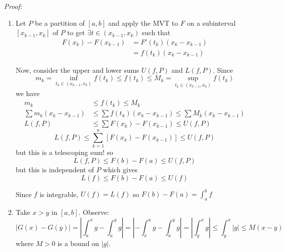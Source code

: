 \documentclass[12pt]{report}
\newcommand{\R}{\mathbb{R}}
\newcommand{\abs}[1]{\left\vert #1 \right\vert}
\newenvironment*{tbox}[2][gray]{
    \begin{tcolorbox}[
        parbox=false,
        colback=#1!5!white,
        colframe=#1!75!black,
        breakable,
        title={#2}
    ]}
    {\end{tcolorbox}}
\begin{document}
    \begin{tbox}{\textbf{Fundamental Theorem of Calculus:} 
        \begin{enumerate}[label=(\roman*)]
            \item If $f: [a, b] \to \R$ is integrable and $F: [a, b] \to \R$ satisfies $F'(x) = f(x)$ for all $x \in [a, b]$, then 
            \[\int_a^b f = F(b) - F(a)\]
            \item Let $g: [a, b] \to \R$ be integrable and define $G(x) = \int_a^x f$ for all $x \in [a, b]$. Then: $G$ is continuous on $[a, b]$. If $g$ is continuous at some point $c \in [a, b]$, then $G$ is differentiable at $c$ and $G'(c) = g(c)$
        \end{enumerate}}
        \emph{Proof:} 

        \begin{enumerate}[label=(\roman*)]
            \item Let $P$ be a partition of $[a, b]$ and apply the MVT to $F$ on a subinterval $[x_{k-1}, x_k]$ of $P$ to get $\exists t \in (x_{k - 1}, x_k)$ such that 
            \begin{align*}
                F(x_k) - F(x_{k-1}) &= F'(t_k)(x_k - x_{k-1})\\ 
                &= f(t_k) (x_k - x_{k-1})
            \end{align*}

            Now, consider the upper and lower sums $U(f, P)$ and $L(f, P)$. Since 
            \[m_k = \inf_{t_k \in (x_{k-1}, x_k)} f(t_k) \leq f(t_k) \leq M_k = \sup_{t_k \in (x_{k-1}, x_k)} f(t_k)\]
            we have
            \begin{align*}
                m_k &\leq f(t_k) \leq M_k\\ 
                \sum m_k(x_k - x_{k-1}) &\leq \sum f(t_k)(x_k - x_{k-1})\leq  \sum M_k(x_k - x_{k-1})\\ 
                L(f, P) &\leq \sum F(x_k) - F(x_{k-1}) \leq U(f, P)
            \end{align*}
            \[L(f, P) \leq \sum_{k=1}^n [F(x_k) - F(x_{k-1})] \leq U(f, P)\]
            but this is a telescoping sum! so 
            \[L(f, P) \leq F(b) - F(a) \leq U(f, P)\]
            but this is independent of $P$ which gives 
            \[L(f) \leq F(b) - F(a) \leq U(f)\]

            Since $f$ is integrable, $U(f) = L(f)$ so $F(b) - F(a) = \int_a^b f$

            \item Take $x > y$ in $[a, b]$. Observe: 
            \[\abs{G(x) - G(y)} = \abs{\int_a^x g - \int_a^y g} = \abs{-\int_x^a g - \int_a^y g} = \abs{\int_y^x g} \leq \int_y^x \abs{g} \leq M(x - y)\]
            where $M > 0$ is a bound on $\abs{g}$. 


\end{enumerate}
\end{tbox}
\end{document}
